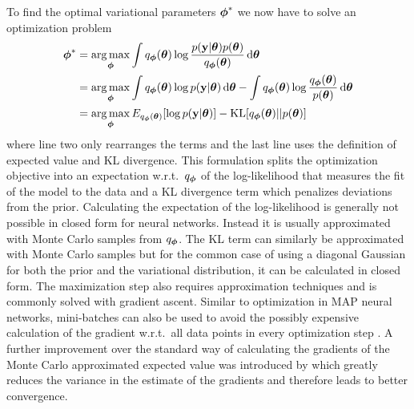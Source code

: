 \documentclass[../thesis.tex]{subfiles}
\begin{document}
To find the optimal variational parameters $\boldsymbol{\mathbf{\phi}}^{*}$ we now have to solve an optimization problem
\begin{equation}
    \begin{split}
        \boldsymbol{\mathbf{\phi}}^{*} &= \operatorname*{arg\,max}_{\boldsymbol{\mathbf{\phi}}} \int q_{\boldsymbol{\mathbf{\phi}}}(\boldsymbol{\mathbf{\theta}}) \log \frac{p(\boldsymbol{\mathbf{y}} | \boldsymbol{\mathbf{\theta}}) p(\boldsymbol{\mathbf{\theta}})} {q_{\boldsymbol{\mathbf{\phi}}}(\boldsymbol{\mathbf{\theta}})} \mathop{}\!\mathrm{d} \boldsymbol{\mathbf{\theta}} \\
        &= \operatorname*{arg\,max}_{\boldsymbol{\mathbf{\phi}}} \int q_{\boldsymbol{\mathbf{\phi}}}(\boldsymbol{\mathbf{\theta}}) \log p(\boldsymbol{\mathbf{y}} | \boldsymbol{\mathbf{\theta}}) \mathop{}\!\mathrm{d} \boldsymbol{\mathbf{\theta}}  -  \int q_{\boldsymbol{\mathbf{\phi}}}(\boldsymbol{\mathbf{\theta}}) \log \frac{q_{\boldsymbol{\mathbf{\phi}}}(\boldsymbol{\mathbf{\theta}})} {p(\boldsymbol{\mathbf{\theta}})} \mathop{}\!\mathrm{d} \boldsymbol{\mathbf{\theta}} \\
        &= \operatorname*{arg\,max}_{\boldsymbol{\mathbf{\phi}}} E_{{q_{\boldsymbol{\mathbf{\phi}}}(\boldsymbol{\mathbf{\theta}})}} [\log p(\boldsymbol{\mathbf{y}} | \boldsymbol{\mathbf{\theta}})] - \operatorname{KL}[q_{\boldsymbol{\mathbf{\phi}}}(\boldsymbol{\mathbf{\theta}})||p(\boldsymbol{\mathbf{\theta}})]    
    \end{split}
\end{equation}
where line two only rearranges the terms and the last line uses the definition of expected value and KL divergence. This formulation splits the optimization objective into an expectation w.r.t.\ $q_{\boldsymbol{\mathbf{\phi}}}$ of the log-likelihood that measures the fit of the model to the data and a KL divergence term which penalizes deviations from the prior. Calculating the expectation of the log-likelihood is generally not possible in closed form for neural networks. Instead it is usually approximated with Monte Carlo samples from $q_{\boldsymbol{\mathbf{\phi}}}$. The KL term can similarly be approximated with Monte Carlo samples but for the common case of using a diagonal Gaussian for both the prior and the variational distribution, it can be calculated in closed form. The maximization step also requires approximation techniques and is commonly solved with gradient ascent. Similar to optimization in MAP neural networks, mini-batches can also be used to avoid the possibly expensive calculation of the gradient w.r.t.\ all data points in every optimization step \parencite{ranganath2014black}. A further improvement over the standard way of calculating the gradients of the Monte Carlo approximated expected value was introduced by \textcite{kingma2015variational} which greatly reduces the variance in the estimate of the gradients and therefore leads to better convergence.
\end{document}
